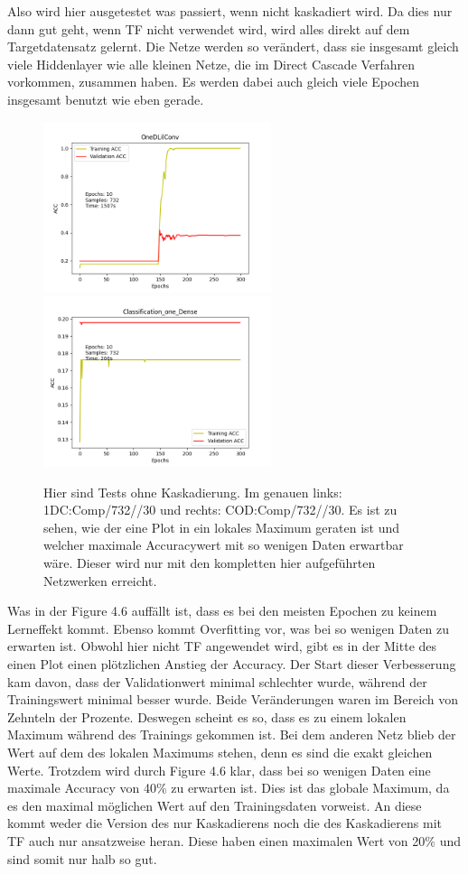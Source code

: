 Also wird hier ausgetestet was passiert, wenn nicht kaskadiert wird. Da dies nur dann gut geht, wenn TF nicht verwendet wird, wird alles direkt 
auf dem Targetdatensatz gelernt. Die Netze werden so verändert, dass sie insgesamt gleich viele Hiddenlayer wie alle kleinen Netze, die im 
Direct Cascade Verfahren vorkommen, zusammen haben. Es werden dabei auch gleich viele Epochen insgesamt benutzt wie eben gerade. 

\begin{figure}[htpb]
    \includegraphics[height=5cm]{../../Plots/ba_plots/classnocascade/1dc.png}
    \includegraphics[height=5cm]{../../Plots/ba_plots/classnocascade/cod.png}
    \caption{\label{fig:nocascade} 
    \small{Hier sind Tests ohne Kaskadierung. Im genauen links: 1DC:Comp/732//30 und rechts: COD:Comp/732//30. Es ist zu sehen, wie der eine Plot 
    in ein lokales Maximum geraten ist und welcher maximale Accuracywert mit so wenigen Daten erwartbar wäre. Dieser wird nur mit den kompletten 
    hier aufgeführten Netzwerken erreicht.}}
\end{figure}

Was in der Figure 4.6 auffällt ist, dass es bei den meisten Epochen zu keinem Lerneffekt kommt. Ebenso kommt Overfitting vor, was bei so wenigen 
Daten zu erwarten ist. Obwohl hier nicht TF angewendet wird, gibt es in der Mitte des einen Plot einen plötzlichen Anstieg der Accuracy. 
Der Start dieser Verbesserung kam davon, dass der Validationwert minimal schlechter wurde, während der Trainingswert minimal besser wurde. 
Beide Veränderungen waren im Bereich von Zehnteln der Prozente. 
Deswegen scheint es so, dass es zu einem lokalen Maximum während des Trainings gekommen ist. Bei dem anderen Netz blieb der Wert auf dem des 
lokalen Maximums stehen, denn es sind die exakt gleichen Werte. Trotzdem wird durch Figure 4.6 klar, dass bei so wenigen Daten eine maximale 
Accuracy von 40\% zu erwarten ist. Dies ist das globale Maximum, da es den maximal möglichen Wert auf den Trainingsdaten vorweist. 
An diese kommt weder die Version des nur Kaskadierens noch die des Kaskadierens mit TF auch nur 
ansatzweise heran. Diese haben einen maximalen Wert von 20\% und sind somit nur halb so gut. 

